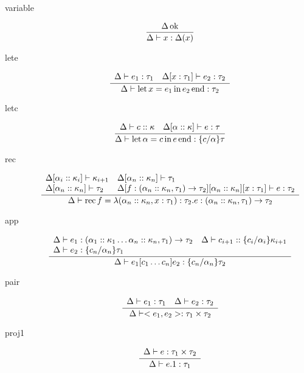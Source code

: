 \documentclass[12pt,twoside,fleqn]{amsart}
\theoremstyle{plain}
\theoremstyle{plain}
\theoremstyle{definition}
\begin{document}
\begin{description}
\item [variable]
\[
\frac{\Delta  \, \mathrm{ok} }{\Delta  \vdash x  :\Delta (x)  }\]

\item [lete]
\[
\frac{\begin{array}{ll}
\Delta  \vdash e_{1}  :\tau _{1}  & \Delta  [x  :\tau _{1}  ] \vdash e_{2} :\tau _{2}
\end{array}}{\Delta  \vdash \mathrm{let}\, x =e_{1} \, \mathrm{in}\, e_{2} \, \mathrm{end}  :\tau _{2} }\]

\item [letc]
\[
\frac{\begin{array}{ll}
\Delta  \vdash c  ::\kappa   & \Delta  [\alpha   ::\kappa   ] \vdash e :\tau 
\end{array}}{\Delta  \vdash \mathrm{let}\, \alpha  =c \, \mathrm{in}\, e \, \mathrm{end}  :\{c /\alpha  \}\tau  }\]

\item [rec]
\[
\frac{\begin{array}{ll}
\Delta  [\alpha _{i}  ::\kappa _{i}  ] \vdash \kappa _{i+1} & \Delta  [\alpha _{n}  ::\kappa _{n}  ] \vdash \tau _{1}\\
\Delta  [\alpha _{n}  ::\kappa _{n}  ] \vdash \tau _{2} & \Delta [f :(\alpha _{n}::\kappa _{n},\tau _{1})\rightarrow \tau _{2} ][\alpha _{n} ::\kappa _{n} ][x :\tau _{1} ] \vdash e :\tau _{2}
\end{array} }{\Delta  \vdash \mathrm{rec}\, f =\lambda (\alpha _{n} ::\kappa _{n} ,x :\tau _{1} ):\tau _{2} .e  :(\alpha _{n}::\kappa _{n},\tau _{1})\rightarrow \tau _{2}  }\]

\item [app]
\[
\frac{\begin{array}{ll}
\Delta  \vdash e_{1}  :(\alpha _{1}::\kappa _{1}\ldots \alpha _{n}::\kappa _{n},\tau _{1})\rightarrow \tau _{2}  & \Delta  \vdash c_{i+1} ::\{c_{i} /\alpha _{i} \}\kappa _{i+1}\\
\Delta  \vdash e_{2}  :\{c_{n} /\alpha _{n} \}\tau _{1}  & 
\end{array} }{\Delta  \vdash e_{1}[c_{1}\ldots c_{n}]e_{2}  :\{c_{n} /\alpha _{n} \}\tau _{2}  }\]

\item [pair]
\[
\frac{\begin{array}{ll}
\Delta  \vdash e_{1}  :\tau _{1}  & \Delta  \vdash e_{2}  :\tau _{2} 
\end{array} }{\Delta  \vdash <e_{1},e_{2}>  :\tau _{1}\times \tau _{2}  }\]

\item [proj1]
\[
\frac{\begin{array}{ll}
\Delta  \vdash e  :\tau _{1}\times \tau _{2} 
\end{array} }{\Delta  \vdash e.1  :\tau _{1}  }\]


\end{description}
\end{document}
